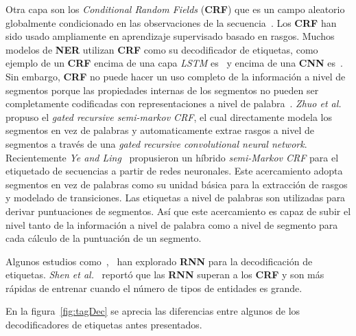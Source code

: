 Otra capa son los \emph{Conditional Random Fields} (\textbf{CRF}) que es un campo aleatorio globalmente condicionado en las observaciones de la secuencia~\cite{lafferty2001conditional}. Los \textbf{CRF} han sido usado ampliamente en aprendizaje supervisado basado en rasgos. Muchos modelos de \textbf{NER} utilizan \textbf{CRF} como su decodificador de etiquetas, como ejemplo de un \textbf{CRF} encima de una capa \emph{LSTM} es~\cite{peters2018deep} y encima de una \textbf{CNN} es~\cite{collobert2011natural}. Sin embargo, \textbf{CRF} no puede hacer un uso completo de la informaci\'on a nivel de segmentos porque las propiedades internas de los segmentos no pueden ser completamente codificadas con representaciones a nivel de palabra~\cite{li2018survey}. \emph{Zhuo et al.}~\cite{zhuo2016segment} propuso el \emph{gated recursive semi-markov CRF}, el cual directamente modela los segmentos en vez de palabras y automaticamente extrae rasgos a nivel de segmentos a trav\'es de una \emph{gated recursive convolutional neural network}. Recientemente \emph{Ye and Ling}~\cite{ye2018hybrid} propusieron un h\'ibrido \emph{semi-Markov CRF} para el etiquetado de secuencias a partir de redes neuronales. Este acercamiento adopta segmentos en vez de palabras como su unidad b\'asica para la extracci\'on de rasgos y modelado de transiciones. Las etiquetas a nivel de palabras son utilizadas para derivar puntuaciones de segmentos. As\'i que este acercamiento es capaz de subir el nivel tanto de la informaci\'on a nivel de palabra como a nivel de segmento para cada c\'alculo de la puntuaci\'on de un segmento.

Algunos estudios como~\cite{zheng2017joint},~\cite{vaswani2016supertagging} han explorado \textbf{RNN} para la decodificaci\'on de etiquetas. \emph{Shen et al.}~\cite{shen2017deep} report\'o que las \textbf{RNN} superan a los \textbf{CRF} y son m\'as r\'apidas de entrenar cuando el n\'umero de tipos de entidades es grande.


En la figura~\ref{fig:tagDec} se aprecia las diferencias entre algunos de los decodificadores de etiquetas antes presentados.

